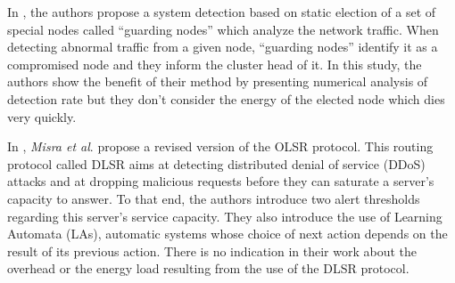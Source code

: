
In
\cite{LC08},
the authors propose a system detection based on static election of a set of special nodes called ``guarding nodes'' which analyze the network traffic.
When detecting abnormal traffic from a given node, ``guarding nodes'' identify it as a compromised node and they inform the cluster head of it.
In this study, the authors show the benefit of their method by presenting numerical analysis of detection rate but they don't consider the energy of the elected node which dies very quickly.



In
\cite{MKASF10},
\textit{Misra et al}. propose a revised version of the OLSR protocol.
This routing protocol called DLSR aims at detecting distributed denial of service (DDoS) attacks and at dropping malicious requests before they can saturate a server's capacity to answer.
To that end, the authors introduce two alert thresholds regarding this server's service capacity.
They also introduce the use of Learning Automata (LAs), automatic systems whose choice of next action depends on the result of its previous action.
There is no indication in their work about the overhead or the energy load resulting from the use of the DLSR protocol.

